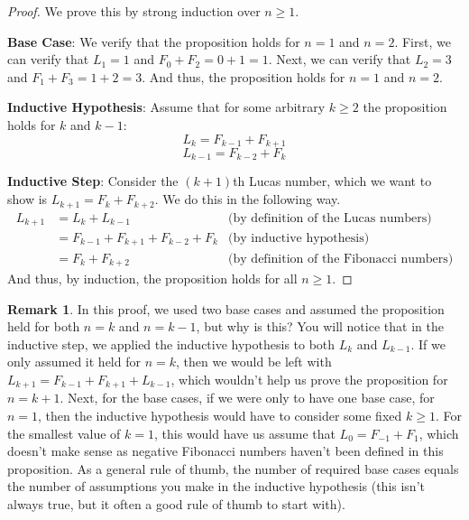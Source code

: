 \documentclass{article}
\theoremstyle{plain}
\theoremstyle{definition}
\newtheorem{remark}{Remark}
\begin{document}
\begin{proof}
    We prove this by strong induction over \(n \geq 1\).
    
    \textbf{Base Case}: We verify that the proposition holds for \(n=1\) and \(n=2\). First, we can verify that \(L_1 = 1\) and \(F_0 + F_2 = 0 + 1 = 1\). Next, we can verify that \(L_2 = 3\) and \(F_1 + F_3 = 1 + 2 = 3\). And thus, the proposition holds for \(n=1\) and \(n=2\).

    \textbf{Inductive Hypothesis}: Assume that for some arbitrary \(k \geq 2\) the proposition holds for \(k\) and \(k-1\):
    \[L_k = F_{k-1} + F_{k+1}\]
    \[L_{k-1} = F_{k-2} + F_{k}\]

    \textbf{Inductive Step}: Consider the \((k+1)\)th Lucas number, which we want to show is \(L_{k+1} = F_{k} + F_{k+2}\). We do this in the following way.
    \[\begin{array}{rll}
        L_{k+1} \!\!\!\! &= L_{k} + L_{k-1} & \text{(by definition of the Lucas numbers)} \\
        &= F_{k-1} + F_{k+1} + F_{k-2} + F_{k} & \text{(by inductive hypothesis)} \\
        &= F_{k} + F_{k+2} & \text{(by definition of the Fibonacci numbers)}
    \end{array}\]
    And thus, by induction, the proposition holds for all \(n \geq 1\).
\end{proof}

\begin{remark}
    In this proof, we used two base cases and assumed the proposition held for both \(n=k\) and \(n=k-1\), but why is this? You will notice that in the inductive step, we applied the inductive hypothesis to both \(L_k\) and \(L_{k-1}\). If we only assumed it held for \(n=k\), then we would be left with \(L_{k+1} = F_{k-1} + F_{k+1} + L_{k-1}\), which wouldn't help us prove the proposition for \(n=k+1\). Next, for the base cases, if we were only to have one base case, for \(n=1\), then the inductive hypothesis would have to consider some fixed \(k \geq 1\). For the smallest value of \(k=1\), this would have us assume that \(L_0 = F_{-1} + F_{1}\), which doesn't make sense as negative Fibonacci numbers haven't been defined in this proposition. As a general rule of thumb, the number of required base cases equals the number of assumptions you make in the inductive hypothesis (this isn't always true, but it often a good rule of thumb to start with).
\end{remark}
\end{document}
